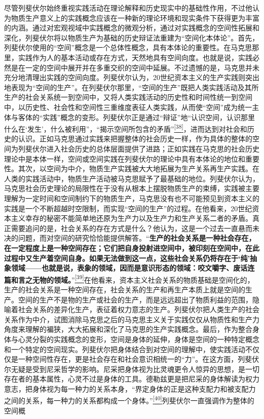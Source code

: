 \documentclass[UTF8, fontset = sourcesans, a4paper, oneside, zihao =
-4, scheme=chinese, no-math, space=true]{ctexbook}
\begin{document}
尽管列斐伏尔始终重视实践活动在理论解释和历史现实中的基础性作用，不过他认为物质生产意义上的实践概念应该在一种新的理论环境和现实条件下获得更为丰富的内涵。通过对宏观视域中实践概念的微观分析，通过对实践概念的空间性拓展和深化，列斐伏尔将以物质生产为基础的历史辩证法重建为``空间化本体论''。首先，列斐伏尔使用的``空间''概念是一个总体性概念，具有本体论的重要性。在马克思那里，实践作为人的基本活动或存在方式，天然地具有空间向度。也就是说，实践必然是在一定的空间中展开并在多重交织的空间中延展。不过遗憾的是，马克思并未充分地清理出实践的空间向度。列斐伏尔认为，20世纪资本主义的生产实践则突出地表现为``空间的生产''。在列斐伏尔那里，``空间的生产''既把人类实践活动及其所生产的社会关系统一到空间中，又将人类实践活动的历史性和时间性统一到空间中，以历史性、社会性和空间性三重维度表征人类实践，从而使``空间''成为统一主体与客体的``实践''概念的变形。列斐伏尔正是通过``辩证''地``认识空间，认识那里什么在`发生'，什么被利用''，``揭示空间所包含的矛盾''\protect\hypertarget{part0010_split_002.htmlux5cux23w38}{}{}\protect\hyperlink{part0010_split_002.htmlux5cux23m38}{\textsuperscript{{[}38{]}}}，进而达到对社会和历史的认识。正如马克思通过实践来把握整体的社会历史一样，作为具体的整体的空间为列斐伏尔进入社会历史的总体层面提供了进路；正如实践在马克思的社会历史理论中是本体一样，空间或空间实践在列斐伏尔的理论中具有本体论的地位和重要性。其次，以空间为中介，物质生产实践被大大地拓展为生产关系再生产实践。在人类的实践活动中，物质生产活动被马克思赋予了最基础的地位。列斐伏尔认为，马克思社会历史理论的局限性在于没有从根本上摆脱物质生产的束缚，实践被主要理解为一定时间和空间制约下的物质生产，马克思没有也不可能预见到资本主义的实践是一个不断超越时空限制，而实现``空间的生产''的过程。在他看来，20世纪资本主义幸存的秘密不能简单地还原为生产力以及生产力和生产关系二者的矛盾。真正需要追问的是，社会关系的存在方式是什么？他认为，这是一个过去一直悬而未决的问题，而对空间的研究恰恰能提供解答。``\textbf{生产的社会关系是一种社会存在，在一定程度上是一种空间存在；它们把自身投射进空间中，被印刻在空间中，在此过程中又生产着空间自身。如果无法做到这一点，这些社会关系仍将存在于`纯'抽象领域------也就是说，表象的领域，因而是意识形态的领域：咬文嚼字、废话连篇和言之无物的领域。}''\protect\hypertarget{part0010_split_002.htmlux5cux23w39}{}{}\protect\hyperlink{part0010_split_002.htmlux5cux23m39}{\textsuperscript{{[}39{]}}}在他看来，资本主义社会关系的物质基础是空间化的，生产的社会关系是一种空间存在，社会关系的生产和再生产本质上就是空间的生产。空间的生产不是物的生产或社会的生产，而是远远超出了物质利益的范围，隐喻着社会关系的差异化生产，表征着权力意志的生产。列斐伏尔把人类生产的社会关系作为中介，试图消除马克思之后的马克思主义关于实践仅仅从物质性和生产力角度来理解的褊狭，大大拓展和深化了马克思的生产实践概念。最后，作为整合身体与心灵分裂的实践概念的变形，空间是身体的延伸，身体是空间的一种特定概念和一个特定的空间现实。列斐伏尔把身体结合到对空间的理解中，使实践活动不仅仅是一种空间性存在，更是社会存在和社会意识相统一的``力''。在这方面，列斐伏尔无疑是受到尼采哲学的影响。尼采把身体视为比灵魂更令人惊异的思想，是一切存在者的基本属性，心灵不过是身体的工具。德勒兹更是把尼采的身体解读为权力意志，把身体视为每一种力的关系本身，``界定身体的正是这种支配力和被支配力之间的关系，每一种力的关系都构成一个身体。''\protect\hypertarget{part0010_split_002.htmlux5cux23w40}{}{}\protect\hyperlink{part0010_split_002.htmlux5cux23m40}{\textsuperscript{{[}40{]}}}列斐伏尔一直强调作为整体的空间概
\end{document}
